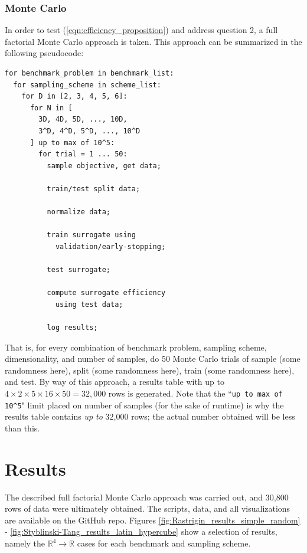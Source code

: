 \documentclass[conference]{IEEEtran}
\begin{document}
\subsubsection{Monte Carlo}

In order to test (\ref{eqn:efficiency_proposition}) and address question 2, a full factorial Monte Carlo approach is taken. This approach can be summarized in the following pseudocode:

\begin{verbatim}
for benchmark_problem in benchmark_list:
  for sampling_scheme in scheme_list:
    for D in [2, 3, 4, 5, 6]:
      for N in [
      	3D, 4D, 5D, ..., 10D,
      	3^D, 4^D, 5^D, ..., 10^D
      ] up to max of 10^5:
        for trial = 1 ... 50:
          sample objective, get data;
      
          train/test split data;
      
          normalize data;
      
          train surrogate using
            validation/early-stopping;
        
          test surrogate;
        
          compute surrogate efficiency
            using test data;
        
          log results;
\end{verbatim}

\noindent That is, for every combination of benchmark problem, sampling scheme, dimensionality, and number of samples, do 50 Monte Carlo trials of sample (some randomness here), split (some randomness here), train (some randomness here), and test. By way of this approach, a results table with up to $4\times 2\times 5\times 16\times 50 = 32,000$ rows is generated. Note that the ``\texttt{up to max of 10\^{}5}" limit placed on number of samples (for the sake of runtime) is why the results table contains \textit{up to} 32,000 rows; the actual number obtained will be less than this.

\section{Results}

The described full factorial Monte Carlo approach was carried out, and 30,800 rows of data were ultimately obtained. The scripts, data, and all visualizations are available on the GitHub repo. Figures \ref{fig:Rastrigin_results_simple_random} - \ref{fig:Styblinski-Tang_results_latin_hypercube} show a selection of results, namely the $\mathbb{R}^4\to\mathbb{R}$ cases for each benchmark and sampling scheme.
\end{document}
